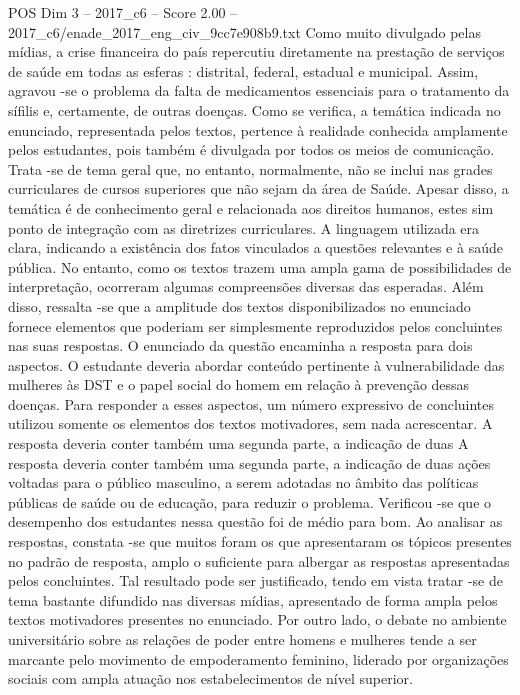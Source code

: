 \begin{textsample}{POS Dim 3 – 2017\_c6 – Score 2.00 – 2017\_c6/enade\_2017\_eng\_civ\_9cc7e908b9.txt}
Como muito divulgado pelas mídias, a crise financeira do país repercutiu diretamente na prestação de serviços de saúde em todas as esferas : distrital, federal, estadual e municipal.
Assim, agravou -se o problema da falta de medicamentos essenciais para o tratamento da sífilis e, certamente, de outras doenças.
Como se verifica, a temática indicada no enunciado, representada pelos textos, pertence à realidade conhecida amplamente pelos estudantes, pois também é divulgada por todos os meios de comunicação.
Trata -se de tema geral que, no entanto, normalmente, não se inclui nas grades curriculares de cursos superiores que não sejam da área de Saúde.
Apesar disso, a temática é de conhecimento geral e relacionada aos direitos humanos, estes sim ponto de integração com as diretrizes curriculares.
A linguagem utilizada era clara, indicando a existência dos fatos vinculados a questões relevantes e à saúde pública.
No entanto, como os textos trazem uma ampla gama de possibilidades de interpretação, ocorreram algumas compreensões diversas das esperadas.
Além disso, ressalta -se que a amplitude dos textos disponibilizados no enunciado fornece elementos que poderiam ser simplesmente reproduzidos pelos concluintes nas suas respostas.
O enunciado da questão encaminha a resposta para dois aspectos.
O estudante deveria abordar conteúdo pertinente à vulnerabilidade das mulheres às DST e o papel social do homem em relação à prevenção dessas doenças.
Para responder a esses aspectos, um número expressivo de concluintes utilizou somente os elementos dos textos motivadores, sem nada acrescentar.
A resposta deveria conter também uma segunda parte, a indicação de duas A resposta deveria conter também uma segunda parte, a indicação de duas ações voltadas para o público masculino, a serem adotadas no âmbito das políticas públicas de saúde ou de educação, para reduzir o problema.
Verificou -se que o desempenho dos estudantes nessa questão foi de médio para bom.
Ao analisar as respostas, constata -se que muitos foram os que apresentaram os tópicos presentes no padrão de resposta, amplo o suficiente para albergar as respostas apresentadas pelos concluintes.
Tal resultado pode ser justificado, tendo em vista tratar -se de tema bastante difundido nas diversas mídias, apresentado de forma ampla pelos textos motivadores presentes no enunciado.
Por outro lado, o debate no ambiente universitário sobre as relações de poder entre homens e mulheres tende a ser marcante pelo movimento de empoderamento feminino, liderado por organizações sociais com ampla atuação nos estabelecimentos de nível superior.

\end{textsample}
